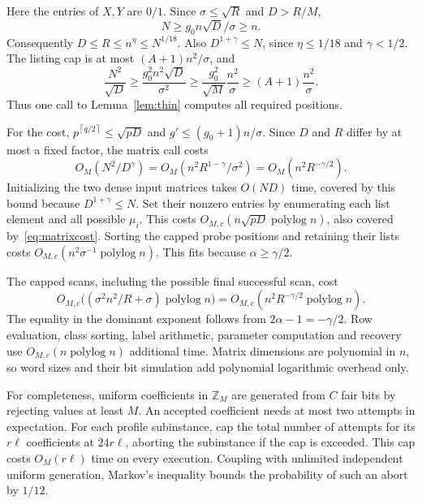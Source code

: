 \documentclass[acmsmall,11pt,nonacm,natbib=false]{acmart}
\newcommand{\Z}{\mathbb Z}
\newcommand{\polylog}{\operatorname{polylog}}
\newcommand{\ceil}[1]{\left\lceil #1\right\rceil}
\begin{document}
Here the entries of $X,Y$ are $0/1$. Since $\sigma\le\sqrt R$ and
$D>R/M$,
\[
 N\ge g_0n\sqrt D/\sigma\ge n.
\]
Consequently $D\le R\le n^\eta\le N^{1/18}$. Also
$D^{1+\gamma}\le N$, since $\eta\le1/18$ and $\gamma<1/2$.
The listing cap is at most $(A+1)n^2/\sigma$, and
\begin{equation}\label{eq:querybudget}
 \frac{N^2}{\sqrt D}\ge
 \frac{g_0^2n^2\sqrt D}{\sigma^2}\ge
 \frac{g_0^2}{\sqrt M}\frac{n^2}{\sigma}\ge
 (A+1)\frac{n^2}{\sigma}.
\end{equation}
Thus one call to Lemma~\ref{lem:thin} computes all required positions.

For the cost, $p^{\ceil{q/2}}\le\sqrt{pD}$ and
$g'\le(g_0+1)n/\sigma$. Since $D$ and $R$ differ by at most a fixed
factor, the matrix call costs
\begin{equation}\label{eq:matrixcost}
 O_M(N^2/D^\gamma)=O_M(n^2R^{1-\gamma}/\sigma^2)
 =O_M(n^2R^{-\gamma/2}).
\end{equation}
Initializing the two dense input matrices takes $O(ND)$ time, covered by
this bound because $D^{1+\gamma}\le N$. Set their nonzero entries by
enumerating each list element and all possible $\mu_i$. This costs
$O_{M,c}(n\sqrt{pD}\polylog n)$, also covered by~\eqref{eq:matrixcost}.
Sorting the capped probe positions and retaining their lists costs
$O_{M,c}(n^2\sigma^{-1}\polylog n)$. This fits because
$\alpha\ge\gamma/2$.

The capped scans, including the possible final successful scan, cost
\begin{equation}\label{eq:scancost}
 O_{M,c}\bigl((\sigma^2n^2/R+\sigma)\polylog n\bigr)
 =O_{M,c}(n^2R^{-\gamma/2}\polylog n).
\end{equation}
The equality in the dominant exponent follows from
$2\alpha-1=-\gamma/2$. Row evaluation, class sorting, label arithmetic,
parameter computation and recovery use $O_{M,c}(n\polylog n)$ additional
time. Matrix dimensions are polynomial in $n$, so word sizes and their
bit simulation add polynomial logarithmic overhead only.

For completeness, uniform coefficients in $\Z_M$ are generated from
$C$ fair bits by rejecting values at least $M$. An accepted coefficient
needs at most two attempts in expectation. For each profile subinstance,
cap the total number of attempts for its $r\ell$ coefficients at
$24r\ell$, aborting the subinstance if the cap is exceeded. This cap costs
$O_M(r\ell)$ time on every execution. Coupling with unlimited independent
uniform generation, Markov's inequality bounds the probability of such
an abort by $1/12$.
\end{document}
